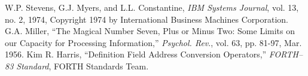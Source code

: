 \begin{references}{9}
 W.P. Stevens, G.J. Myers, and L.L. Constantine,
\emph{ IBM Systems Journal}, vol. 13, no. 2, 1974, Copyright 1974 by
International Business Machines Corporation.
 G.A. Miller, ``The Magical Number Seven, Plus or
Minus Two: Some Limits on our Capacity for Processing Information,''
\emph{Psychol. Rev}., vol. 63, pp. 81-97, Mar. 1956.
 Kim R. Harris, ``Definition Field Address
Conversion Operators,'' \emph{FORTH--83 Standard}, FORTH Standards
Team.
\end{references}

